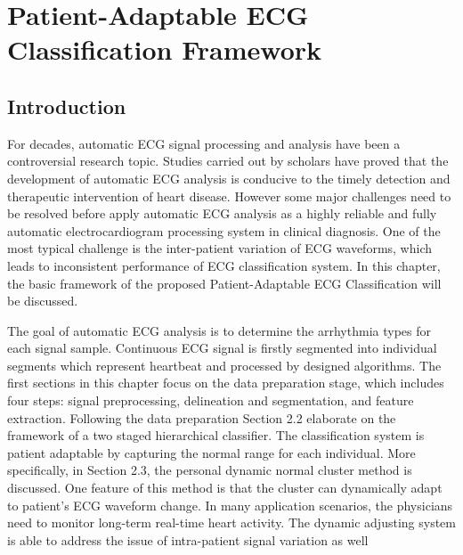 \chapter{Patient-Adaptable ECG Classification Framework}

\section{Introduction}

For decades, automatic ECG signal processing and analysis have been a controversial research topic. Studies carried out by scholars have proved that the development of automatic ECG analysis is conducive to the timely detection and therapeutic intervention of heart disease. However some major challenges need to be resolved before apply automatic ECG analysis as a highly reliable and fully automatic electrocardiogram processing system in clinical diagnosis. One of the most typical challenge is the inter-patient variation of ECG waveforms, which leads to inconsistent performance of ECG classification system. In this chapter, the basic framework of the proposed Patient-Adaptable ECG Classification will be discussed.

The goal of automatic ECG analysis is to determine the arrhythmia types for each signal sample. Continuous ECG signal is firstly segmented into individual segments which represent heartbeat and processed by designed algorithms. The first sections in this chapter focus on the data preparation stage, which includes four steps: signal preprocessing, delineation and segmentation, and feature extraction. Following the data preparation Section 2.2 elaborate on the framework of a two staged hierarchical classifier. The classification system is patient adaptable by capturing the normal range for each individual. More specifically, in Section 2.3, the personal dynamic normal cluster method is discussed. One feature of this method is that the cluster can dynamically adapt to patient's ECG waveform change. In many application scenarios, the physicians need to monitor long-term real-time heart activity. The dynamic adjusting system is able to address the issue of intra-patient signal variation as well


